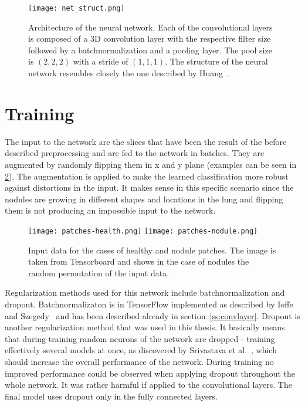 \documentclass[main.tex]{subfiles}
\begin{document}
\begin{figure}
\begin{center}
\texttt{[image: net\_struct.png]}
\end{center}
\caption{Architecture of the neural network. Each of the convolutional layers is composed of a 3D convolution layer with the respective filter size followed by a batchnormalization and a pooling layer. The pool size is $(2,2,2)$ with a stride of $(1,1,1)$. The structure of the neural network resembles closely the one described by Huang~\cite{huang2017lung}.}
\label{fig:net_struct}
\end{figure}


\section{Training}
The input to the network are the slices that have been the result of the before described preprocessing and are fed to the network in batches. They are augmented by randomly flipping them in x and y plane (examples can be seen in \ref{fig:input}). The augmentation is applied to make the learned classification more robust against distortions in the input. It makes sense in this specific scenario since the nodules are growing in different shapes and locations in the lung and flipping them is not producing an impossible input to the network.

\begin{figure}
\begin{center}
\texttt{[image: patches-health.png]}
\texttt{[image: patches-nodule.png]}
\end{center}
\caption{Input data for the cases of healthy and nodule patches. The image is taken from Tensorboard and shows in the case of nodules the random permutation of the input data.}
\label{fig:input}
\end{figure}

Regularization methods used for this network include batchnormalization and dropout. Batchnormalizaton is in TensorFlow implemented as described by Ioffe and Szegedy~\cite{ioffe2015batch} and has been described already in section~\ref{ss:convlayer}. Dropout is another regularization method that was used in this thesis. It basically means that during training random neurons of the network are dropped - training effectively several models at once, as discovered by Srivastava et al.~\cite{srivastava2014dropout}, which should increase the overall performance of the network. During training no improved performance could be observed when applying dropout throughout the whole network. It was rather harmful if applied to the convolutional layers. The final model uses dropout only in the fully connected  layers.
\end{document}
